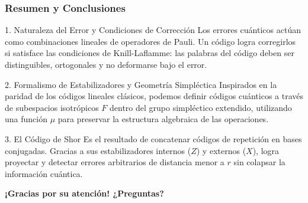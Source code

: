 \begin{frame}
  \frametitle{Resumen y Conclusiones}

  \begin{block}{1. Naturaleza del Error y Condiciones de Corrección}
    Los errores cuánticos actúan como combinaciones lineales de operadores de Pauli. Un código logra corregirlos si satisface las condiciones de Knill-Laflamme: las palabras del código deben ser distinguibles, ortogonales y no deformarse bajo el error.
  \end{block}

  \begin{block}{2. Formalismo de Estabilizadores y Geometría Simpléctica}
    Inspirados en la paridad de los códigos lineales clásicos, podemos definir códigos cuánticos a través de subespacios isotrópicos $F$ dentro del grupo simpléctico extendido, utilizando una función $\mu$ para preservar la estructura algebraica de las operaciones.
  \end{block}

  \begin{block}{3. El Código de Shor}
    Es el resultado de concatenar códigos de repetición en bases conjugadas. Gracias a sus estabilizadores internos ($Z$) y externos ($X$), logra proyectar y detectar errores arbitrarios de distancia menor a $r$ sin colapsar la información cuántica.
  \end{block}

  \vspace{0.4cm}
  \begin{center}
    \Large \textbf{¡Gracias por su atención! ¿Preguntas?}
  \end{center}
\end{frame}
